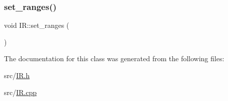 \mbox{\label{class_i_r_a8bcc5c0570384da5a39e395b91bc2d2b}} 
\subsubsection{\texorpdfstring{set\+\_\+ranges()}{set\_ranges()}}
{\footnotesize\ttfamily void I\+R\+::set\+\_\+ranges (\begin{DoxyParamCaption}{ }\end{DoxyParamCaption})}



The documentation for this class was generated from the following files\+:\begin{DoxyCompactItemize}
\item 
src/\mbox{\hyperlink{_i_r_8h}{I\+R.\+h}}\item 
src/\mbox{\hyperlink{_i_r_8cpp}{I\+R.\+cpp}}\end{DoxyCompactItemize}
